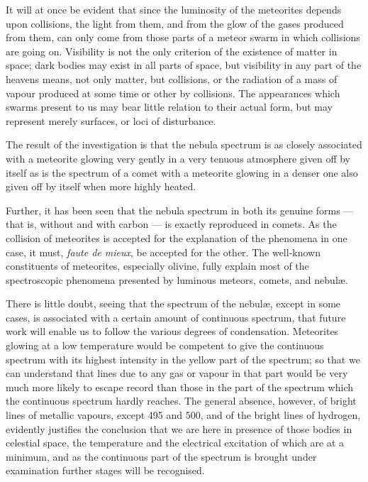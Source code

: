 \documentclass[a4paper, 12pt, oneside, polutonikogreek, english]{article}
\begin{document}
It will at once be evident that since the luminosity of the meteorites depends upon collisions, the light from them, and from the glow of the gases produced from them, can only come from those parts of a meteor swarm in which collisions are going on. Visibility is not the only criterion of the existence of matter in space; dark bodies may exist in all parts of space, but visibility in any part of the heavens means, not only matter, but collisions, or the radiation of a mass of vapour produced at some time or other by collisions. The appearances which swarms present to us may bear little relation to their actual form, but may represent merely surfaces, or loci of disturbance.

The result of the investigation is that the nebula spectrum is as closely associated with a meteorite glowing very gently in a very tenuous atmosphere given off by itself as is the spectrum of a comet with a meteorite glowing in a denser one also given off by itself when more highly heated.

Further, it has been seen that the nebula spectrum in both its genuine forms --- that is, without and with carbon --- is exactly reproduced in comets. As the collision of meteorites is accepted for the explanation of the phenomena in one case, it must, \emph{faute de mieux}, be accepted for the other. The well-known constituents of meteorites, especially olivine, fully explain most of the spectroscopic phenomena presented by luminous meteors, comets, and nebulæ.

There is little doubt, seeing that the spectrum of the nebulæ, except in some cases, is associated with a certain amount of continuous spectrum, that future work will enable us to follow the various degrees of condensation. Meteorites glowing at a low temperature would be competent to give the continuous spectrum with its highest intensity in the yellow part of the spectrum; so that we can understand that lines due to any gas or vapour in that part would be very much more likely to escape record than those in the part of the spectrum which the continuous spectrum hardly reaches. The general absence, however, of bright lines of metallic vapours, except 495 and 500, and of the bright lines of hydrogen, evidently justifies the conclusion that we are here in presence of those bodies in celestial space, the temperature and the electrical excitation of which are at a minimum, and as the continuous part of the spectrum is brought under examination further stages will be recognised.
\end{document}
